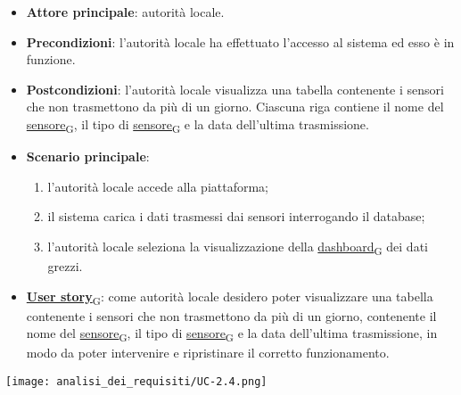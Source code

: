 \newpage
{}
\begin{itemize}
	\item \textbf{Attore principale}: autorità locale.
	\item \textbf{Precondizioni}: l'autorità locale ha effettuato l'accesso al sistema ed esso è in funzione.
	\item \textbf{Postcondizioni}: l'autorità locale visualizza una tabella contenente i sensori che non trasmettono da più di un giorno. Ciascuna riga
	      contiene il nome del \href{https://7last.github.io/docs/pb/documentazione-interna/glossario\#sensore}{sensore\textsubscript{G}}, il tipo di \href{https://7last.github.io/docs/pb/documentazione-interna/glossario\#sensore}{sensore\textsubscript{G}} e la data dell'ultima trasmissione.
	\item \textbf{Scenario principale}:
	      \begin{enumerate}
		      \item l'autorità locale accede alla piattaforma;
		      \item il sistema carica i dati trasmessi dai sensori interrogando il database;
		      \item l'autorità locale seleziona la visualizzazione della \href{https://7last.github.io/docs/pb/documentazione-interna/glossario\#dashboard}{dashboard\textsubscript{G}} dei dati grezzi.
	      \end{enumerate}
	\item \href{https://7last.github.io/docs/pb/documentazione-interna/glossario\#user-story}{\textbf{User story}\textsubscript{G}}:
	      come autorità locale desidero poter visualizzare una tabella contenente i sensori che non trasmettono da più di un giorno, contenente
	      il nome del \href{https://7last.github.io/docs/pb/documentazione-interna/glossario\#sensore}{sensore\textsubscript{G}}, il tipo di \href{https://7last.github.io/docs/pb/documentazione-interna/glossario\#sensore}{sensore\textsubscript{G}} e la data dell'ultima trasmissione, in modo da poter intervenire e ripristinare il corretto funzionamento.
\end{itemize}
\begin{center}
	\texttt{[image: analisi\_dei\_requisiti/UC-2.4.png]}
\end{center}

